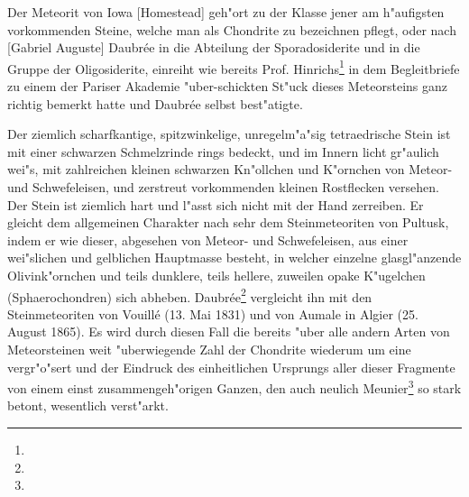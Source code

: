 \documentclass[a4paper, 11pt, oneside]{article}
\begin{document}
Der Meteorit von Iowa [Homestead] geh"ort zu der Klasse jener am h"aufigsten vorkommenden Steine, welche man als Chondrite zu bezeichnen pflegt, oder nach [Gabriel Auguste] Daubrée in die Abteilung der Sporadosiderite und in die Gruppe der Oligosiderite, einreiht wie bereits Prof. Hinrichs\footnote{} in dem Begleitbriefe zu einem der Pariser Akademie "uber-schickten St"uck dieses Meteorsteins ganz richtig bemerkt hatte und Daubrée selbst best"atigte.

Der ziemlich scharfkantige, spitzwinkelige, unregelm"a"sig tetraedrische Stein ist mit einer schwarzen Schmelzrinde rings bedeckt, und im Innern licht gr"aulich wei"s, mit zahlreichen kleinen schwarzen Kn"ollchen und K"ornchen von Meteor- und Schwefeleisen, und zerstreut vorkommenden kleinen Rostflecken versehen. Der Stein ist ziemlich hart und l"asst sich nicht mit der Hand zerreiben. Er gleicht dem allgemeinen Charakter nach sehr dem Steinmeteoriten von Pultusk, indem er wie dieser, abgesehen von Meteor- und Schwefeleisen, aus einer wei"slichen und gelblichen Hauptmasse besteht, in welcher einzelne glasgl"anzende Olivink"ornchen und teils dunklere, teils hellere, zuweilen opake K"ugelchen (Sphaerochondren) sich abheben. Daubrée\footnote{} vergleicht ihn mit den Steinmeteoriten von Vouillé (13. Mai 1831) und von Aumale in Algier (25. August 1865). Es wird durch diesen Fall die bereits "uber alle andern Arten von Meteorsteinen weit "uberwiegende Zahl der Chondrite wiederum um eine vergr"o"sert und der Eindruck des einheitlichen Ursprungs aller dieser Fragmente von einem einst zusammengeh"origen Ganzen, den auch neulich Meunier\footnote{} so stark betont, wesentlich verst"arkt.
\end{document}
